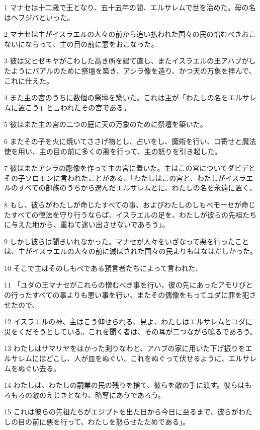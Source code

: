 \par 1 マナセは十二歳で王となり、五十五年の間、エルサレムで世を治めた。母の名はヘフジバといった。
\par 2 マナセは主がイスラエルの人々の前から追い払われた国々の民の憎むべきおこないにならって、主の目の前に悪をおこなった。
\par 3 彼は父ヒゼキヤがこわした高き所を建て直し、またイスラエルの王アハブがしたようにバアルのために祭壇を築き、アシラ像を造り、かつ天の万象を拝んで、これに仕えた。
\par 4 また主の宮のうちに数個の祭壇を築いた。これは主が「わたしの名をエルサレムに置こう」と言われたその宮である。
\par 5 彼はまた主の宮の二つの庭に天の万象のために祭壇を築いた。
\par 6 またその子を火に焼いてささげ物とし、占いをし、魔術を行い、口寄せと魔法使を用い、主の目の前に多くの悪を行って、主の怒りを引き起した。
\par 7 彼はまたアシラの彫像を作って主の宮に置いた。主はこの宮についてダビデとその子ソロモンに言われたことがある、「わたしはこの宮と、わたしがイスラエルのすべての部族のうちから選んだエルサレムとに、わたしの名を永遠に置く。
\par 8 もし、彼らがわたしが命じたすべての事、およびわたしのしもべモーセが命じたすべての律法を守り行うならば、イスラエルの足を、わたしが彼らの先祖たちに与えた地から、重ねて迷い出させないであろう」。
\par 9 しかし彼らは聞きいれなかった。マナセが人々をいざなって悪を行ったことは、主がイスラエルの人々の前に滅ぼされた国々の民よりもはなはだしかった。
\par 10 そこで主はそのしもべである預言者たちによって言われた、
\par 11 「ユダの王マナセがこれらの憎むべき事を行い、彼の先にあったアモリびとの行ったすべての事よりも悪い事を行い、またその偶像をもってユダに罪を犯させたので、
\par 12 イスラエルの神、主はこう仰せられる、見よ、わたしはエルサレムとユダに災をくだそうとしている。これを聞く者は、その耳が二つながら鳴るであろう。
\par 13 わたしはサマリヤをはかった測りなわと、アハブの家に用いた下げ振りをエルサレムにほどこし、人が皿をぬぐい、これをぬぐって伏せるように、エルサレムをぬぐい去る。
\par 14 わたしは、わたしの嗣業の民の残りを捨て、彼らを敵の手に渡す。彼らはもろもろの敵のえじきとなり、略奪にあうであろう。
\par 15 これは彼らの先祖たちがエジプトを出た日から今日に至るまで、彼らがわたしの目の前に悪を行って、わたしを怒らせたためである」。
